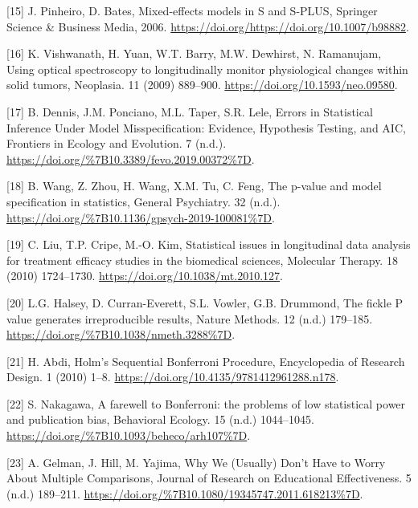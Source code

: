 \documentclass[
]{article}
\begin{document}
\leavevmode\hypertarget{ref-pinheiro2006}{}%
{[}15{]} J. Pinheiro, D. Bates, Mixed-effects models in S and S-PLUS, Springer Science \& Business Media, 2006. \url{https://doi.org/https://doi.org/10.1007/b98882}.

\leavevmode\hypertarget{ref-vishwanath2009}{}%
{[}16{]} K. Vishwanath, H. Yuan, W.T. Barry, M.W. Dewhirst, N. Ramanujam, Using optical spectroscopy to longitudinally monitor physiological changes within solid tumors, Neoplasia. 11 (2009) 889--900. \url{https://doi.org/10.1593/neo.09580}.

\leavevmode\hypertarget{ref-dennis2019}{}%
{[}17{]} B. Dennis, J.M. Ponciano, M.L. Taper, S.R. Lele, Errors in Statistical Inference Under Model Misspecification: Evidence, Hypothesis Testing, and AIC, Frontiers in Ecology and Evolution. 7 (n.d.). \url{https://doi.org/\%7B10.3389/fevo.2019.00372\%7D}.

\leavevmode\hypertarget{ref-wang2019}{}%
{[}18{]} B. Wang, Z. Zhou, H. Wang, X.M. Tu, C. Feng, The p-value and model specification in statistics, General Psychiatry. 32 (n.d.). \url{https://doi.org/\%7B10.1136/gpsych-2019-100081\%7D}.

\leavevmode\hypertarget{ref-liu2010}{}%
{[}19{]} C. Liu, T.P. Cripe, M.-O. Kim, Statistical issues in longitudinal data analysis for treatment efficacy studies in the biomedical sciences, Molecular Therapy. 18 (2010) 1724--1730. \url{https://doi.org/10.1038/mt.2010.127}.

\leavevmode\hypertarget{ref-halsey2015}{}%
{[}20{]} L.G. Halsey, D. Curran-Everett, S.L. Vowler, G.B. Drummond, The fickle P value generates irreproducible results, Nature Methods. 12 (n.d.) 179--185. \url{https://doi.org/\%7B10.1038/nmeth.3288\%7D}.

\leavevmode\hypertarget{ref-abdi2010}{}%
{[}21{]} H. Abdi, Holm's Sequential Bonferroni Procedure, Encyclopedia of Research Design. 1 (2010) 1--8. \url{https://doi.org/10.4135/9781412961288.n178}.

\leavevmode\hypertarget{ref-nakagawa2004}{}%
{[}22{]} S. Nakagawa, A farewell to Bonferroni: the problems of low statistical power and publication bias, Behavioral Ecology. 15 (n.d.) 1044--1045. \url{https://doi.org/\%7B10.1093/beheco/arh107\%7D}.

\leavevmode\hypertarget{ref-gelman2012}{}%
{[}23{]} A. Gelman, J. Hill, M. Yajima, Why We (Usually) Don't Have to Worry About Multiple Comparisons, Journal of Research on Educational Effectiveness. 5 (n.d.) 189--211. \url{https://doi.org/\%7B10.1080/19345747.2011.618213\%7D}.
\end{document}
